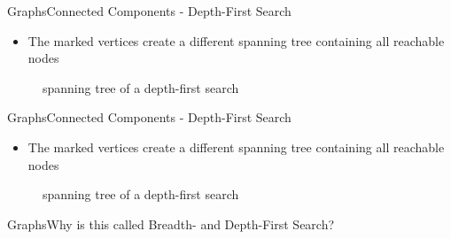 

\begin{frame}{Graphs}{Connected Components - Depth-First Search}
  \begin{itemize}
    \item
      The marked vertices create a different spanning tree containing all
      reachable nodes
  \end{itemize}
  \begin{figure}
    \begin{adjustbox}{width=0.95\linewidth}
      
    \end{adjustbox}
    \caption{spanning tree of a depth-first search}
  \end{figure}
\end{frame}


\begin{frame}{Graphs}{Connected Components - Depth-First Search}
  \begin{itemize}
    \item
      The marked vertices create a different spanning tree containing all
      reachable nodes
  \end{itemize}
  \begin{figure}
    \begin{adjustbox}{width=0.95\linewidth}
      
    \end{adjustbox}
    \caption{spanning tree of a depth-first search}
    \label{fig:graph:depth_first_search_spanning_tree}
  \end{figure}
\end{frame}

\begin{frame}{Graphs}{Why is this called Breadth- and Depth-First Search?}
 
\end{frame}

